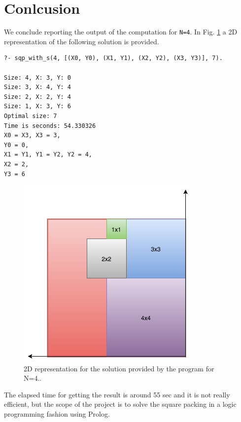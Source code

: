 \documentclass{article}[10pt]
\begin{document}
\section{Conlcusion}

We conclude reporting the output of the computation for \texttt{N=4}. In Fig. \ref{fig:sqp} a 2D representation of the following solution is provided.

\footnotesize{
\begin{verbatim}
?- sqp_with_s(4, [(X0, Y0), (X1, Y1), (X2, Y2), (X3, Y3)], 7).

Size: 4, X: 3, Y: 0
Size: 3, X: 4, Y: 4
Size: 2, X: 2, Y: 4
Size: 1, X: 3, Y: 6
Optimal size: 7
Time is seconds: 54.330326
X0 = X3, X3 = 3,
Y0 = 0,
X1 = Y1, Y1 = Y2, Y2 = 4,
X2 = 2,
Y3 = 6 
\end{verbatim}
}

\begin{figure}[h]
\centering
\includegraphics[scale=0.4]{sqpn4}
\caption{2D representation for the solution provided by the program for N=4..}
\label{fig:sqp}
\end{figure}

The elapsed time for getting the result is around 55 sec and it is not really efficient, but the scope of the project is to solve the square packing in a logic programming fashion using Prolog.
\end{document}
